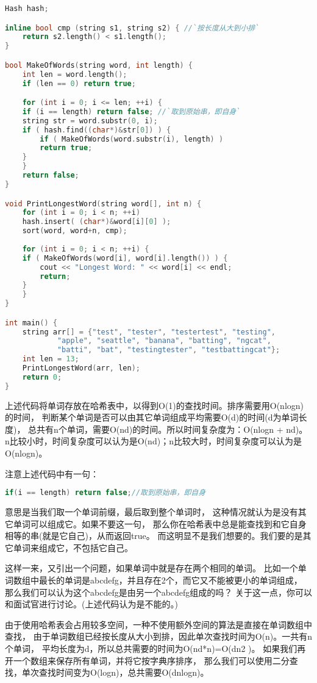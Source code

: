 \begin{description}
\begin{lstlisting}[language=C++]
Hash hash;

inline bool cmp (string s1, string s2) { //`按长度从大到小排`
    return s2.length() < s1.length();
}

bool MakeOfWords(string word, int length) {
    int len = word.length();
    if (len == 0) return true;

    for (int i = 0; i <= len; ++i) {
	if (i == length) return false; //`取到原始串，即自身`
	string str = word.substr(0, i);
	if ( hash.find((char*)&str[0]) ) {
	    if ( MakeOfWords(word.substr(i), length) )
		return true;
	}
    }
    return false;
}

void PrintLongestWord(string word[], int n) {
    for (int i = 0; i < n; ++i) 
	hash.insert( (char*)&word[i][0] );
    sort(word, word+n, cmp);
 
    for (int i = 0; i < n; ++i) {
	if ( MakeOfWords(word[i], word[i].length()) ) {
	    cout << "Longest Word: " << word[i] << endl;
	    return;
	}
    }
}

int main() {
    string arr[] = {"test", "tester", "testertest", "testing", 
		    "apple", "seattle", "banana", "batting", "ngcat", 
		    "batti", "bat", "testingtester", "testbattingcat"};
    int len = 13;
    PrintLongestWord(arr, len);
    return 0;
}
\end{lstlisting}
上述代码将单词存放在哈希表中，以得到O(1)的查找时间。排序需要用O(nlogn)的时间， 判断某个单词是否可以由其它单词组成平均需要O(d)的时间(d为单词长度)， 总共有n个单词，需要O(nd)的时间。所以时间复杂度为：O(nlogn + nd)。 n比较小时，时间复杂度可以认为是O(nd)；n比较大时，时间复杂度可以认为是O(nlogn)。

注意上述代码中有一句：
\begin{lstlisting}[language=C++]
 if(i == length) return false;//取到原始串，即自身
\end{lstlisting}
意思是当我们取一个单词前缀，最后取到整个单词时， 这种情况就认为是没有其它单词可以组成它。如果不要这一句， 那么你在哈希表中总是能查找到和它自身相等的串(就是它自己)，从而返回true。 而这明显不是我们想要的。我们要的是其它单词来组成它，不包括它自己。

这样一来，又引出一个问题，如果单词中就是存在两个相同的单词。 比如一个单词数组中最长的单词是abcdefg，并且存在2个，而它又不能被更小的单词组成， 那么我们可以认为这个abcdefg是由另一个abcdefg组成的吗？ 关于这一点，你可以和面试官进行讨论。(上述代码认为是不能的。)

由于使用哈希表会占用较多空间，一种不使用额外空间的算法是直接在单词数组中查找， 由于单词数组已经按长度从大小到排，因此单次查找时间为O(n)。一共有n个单词， 平均长度为d，所以总共需要的时间为O(nd*n)=O(dn2 )。 如果我们再开一个数组来保存所有单词，并将它按字典序排序， 那么我们可以使用二分查找，单次查找时间变为O(logn)，总共需要O(dnlogn)。



\end{description}
